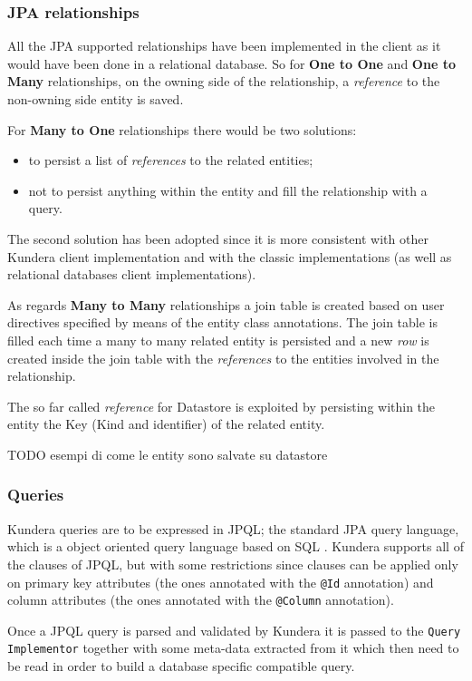 \subsubsection{JPA relationships}
All the JPA supported relationships have been implemented in the client as it would have been done in a relational database.
So for \textbf{One to One} and \textbf{One to Many} relationships, on the owning side of the relationship, a \textit{reference} to the non-owning side entity is saved.

\noindent For \textbf{Many to One} relationships there would be two solutions:
\begin{itemize}
\item to persist a list of \textit{references} to the related entities;
\item not to persist anything within the entity and fill the relationship with a query.
\end{itemize}
The second solution has been adopted since it is more consistent with other Kundera client implementation and with the classic implementations (as well as relational databases client implementations).

\noindent As regards \textbf{Many to Many} relationships a join table is created based on user directives specified by means of the entity class annotations. The join table is filled each time a many to many related entity is persisted and a new \textit{row} is created inside the join table with the \textit{references} to the entities involved in the relationship.

\noindent The so far called \textit{reference} for Datastore is exploited by persisting within the entity the Key (Kind and identifier) of the related entity.

\newparagraph TODO esempi di come le entity sono salvate su datastore

\subsubsection{Queries}
Kundera queries are to be expressed in JPQL; the standard JPA query language, which is a  object oriented query language based on SQL \cite{book:projpa2}.
Kundera supports all of the clauses of JPQL, but with some restrictions since clauses can be applied only on primary key attributes (the ones annotated with the \texttt{@Id} annotation) and column attributes (the ones annotated with the \texttt{@Column} annotation).

\noindent Once a JPQL query is parsed and validated by Kundera it is passed to the \texttt{Query Implementor} together with some meta-data extracted from it which then need to be read in order to build a database specific compatible query.
    
